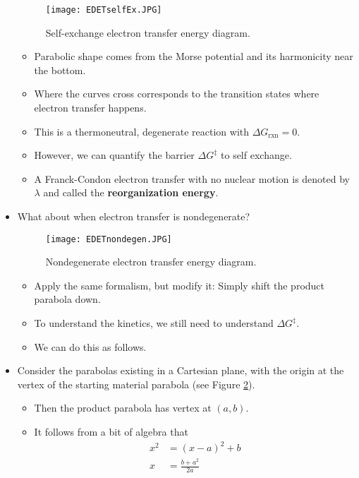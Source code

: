 \documentclass[../notes.tex]{subfiles}
\begin{document}
\begin{itemize}
\begin{figure}[H]
        \centering
        \texttt{[image: EDETselfEx.JPG]}
        \caption{Self-exchange electron transfer energy diagram.}
        \label{fig:EDETselfEx}
    \end{figure}
    \begin{itemize}
        \item Parabolic shape comes from the Morse potential and its harmonicity near the bottom.
        \item Where the curves cross corresponds to the transition states where electron transfer happens.
        \item This is a thermoneutral, degenerate reaction with $\Delta G_\text{rxn}=0$.
        \item However, we can quantify the barrier $\Delta G^\ddagger$ to self exchange.
        \item A Franck-Condon electron transfer with no nuclear motion is denoted by $\lambda$ and called the \textbf{reorganization energy}.
    \end{itemize}
    \item What about when electron transfer is nondegenerate?
    \begin{figure}[h!]
        \centering
        \texttt{[image: EDETnondegen.JPG]}
        \caption{Nondegenerate electron transfer energy diagram.}
        \label{fig:EDETnondegen}
    \end{figure}
    \begin{itemize}
        \item Apply the same formalism, but modify it: Simply shift the product parabola down.
        \item To understand the kinetics, we still need to understand $\Delta G^\ddagger$.
        \item We can do this as follows.
    \end{itemize}
    \item Consider the parabolas existing in a Cartesian plane, with the origin at the vertex of the starting material parabola (see Figure \ref{fig:EDETnondegen}).
    \begin{itemize}
        \item Then the product parabola has vertex at $(a,b)$.
        \item It follows from a bit of algebra that
        \begin{align*}
            x^2 &= (x-a)^2+b\\
            x &= \frac{b+a^2}{2a}
        \end{align*}

\end{itemize}
\end{itemize}
\end{document}
